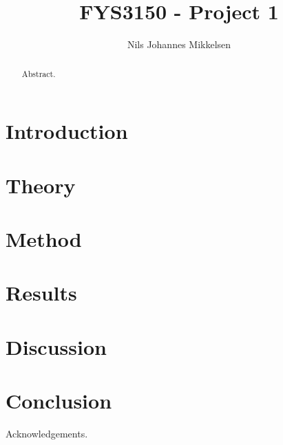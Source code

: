 \documentclass[reprint,english]{revtex4-1}
\begin{document}
\title{FYS3150 - Project 1}
\author{Nils Johannes Mikkelsen}
\data{\today}
\noaffiliation
\begin{abstract}
Abstract.
\end{abstract}
\maketitle

\section{Introduction}
\section{Theory}
\section{Method}
\section{Results}
\section{Discussion}
\section{Conclusion}
\begin{acknowledgments}
Acknowledgements.
\end{acknowledgments}


\end{document}
